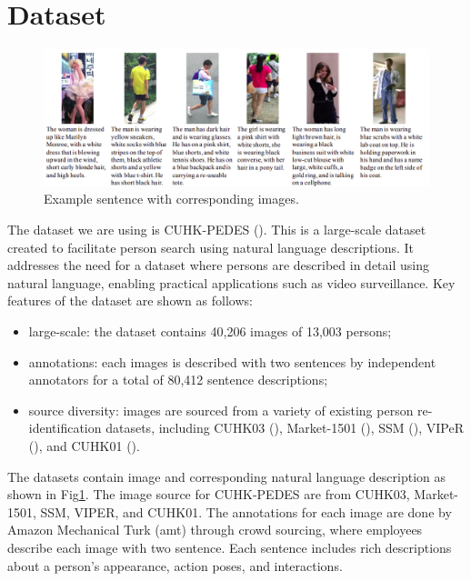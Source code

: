 \section{Dataset}

\begin{figure}[htbp]
  \begin{center}
      \includegraphics[width=\linewidth]{img/cuhk_pedes.png}
      \caption{Example sentence with corresponding images.}
      \label{fig:cuhk_pedes}
  \end{center}
\end{figure}


The dataset we are using is CUHK-PEDES (\cite{li2017personsearchnaturallanguage}). This is a large-scale dataset created to facilitate person search using natural language descriptions. It addresses the need for a dataset where persons are described in detail using natural language, enabling practical applications such as video surveillance. Key features of the dataset are shown as follows:
\begin{itemize}
  \item large-scale: the dataset contains 40,206 images of 13,003 persons; 
  \item annotations: each images is described with two sentences by independent annotators for a total of 80,412 sentence descriptions;
  \item source diversity: images are sourced from a variety of existing person re-identification datasets, including CUHK03 (\cite{li2014deepreid}), Market-1501 (\cite{7410490}), SSM (\cite{ssm}), VIPeR (\cite{viper}), and CUHK01 (\cite{li2012human}).
\end{itemize}

The datasets contain image and corresponding natural language description as shown in Fig\ref{fig:cuhk_pedes}. The image source for CUHK-PEDES are from CUHK03, Market-1501, SSM, VIPER, and CUHK01. The annotations for each image are done by Amazon Mechanical Turk (\acrshort{amt}) through crowd sourcing, where employees describe each image with two sentence. Each sentence includes rich descriptions about a person's appearance, action poses, and interactions.

